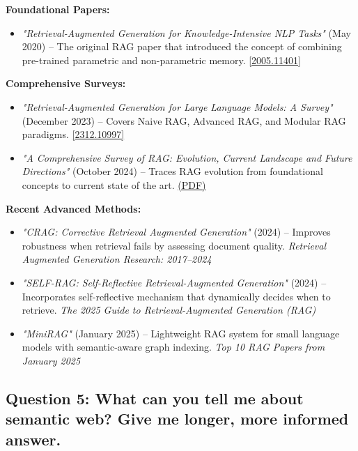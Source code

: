 \documentclass[fleqn,moreauthors,10pt]{ds_report}
\begin{document}
\begin{itemize}
\textbf{Foundational Papers:}
\begin{itemize}
    \item \textit{"Retrieval-Augmented Generation for Knowledge-Intensive NLP Tasks"} (May 2020) – The original RAG paper that introduced the concept of combining pre-trained parametric and non-parametric memory. \href{https://arxiv.org/abs/2005.11401}{[2005.11401]}
\end{itemize}

\textbf{Comprehensive Surveys:}
\begin{itemize}
    \item \textit{"Retrieval-Augmented Generation for Large Language Models: A Survey"} (December 2023) – Covers Naive RAG, Advanced RAG, and Modular RAG paradigms. \href{https://arxiv.org/abs/2312.10997}{[2312.10997]}
    \item \textit{"A Comprehensive Survey of RAG: Evolution, Current Landscape and Future Directions"} (October 2024) – Traces RAG evolution from foundational concepts to current state of the art. \href{https://www.researchgate.net/publication/375755035}{(PDF)}
\end{itemize}

\textbf{Recent Advanced Methods:}
\begin{itemize}
    \item \textit{"CRAG: Corrective Retrieval Augmented Generation"} (2024) – Improves robustness when retrieval fails by assessing document quality. \textit{Retrieval Augmented Generation Research: 2017–2024}
    \item \textit{"SELF-RAG: Self-Reflective Retrieval-Augmented Generation"} (2024) – Incorporates self-reflective mechanism that dynamically decides when to retrieve. \textit{The 2025 Guide to Retrieval-Augmented Generation (RAG)}
    \item \textit{"MiniRAG"} (January 2025) – Lightweight RAG system for small language models with semantic-aware graph indexing. \textit{Top 10 RAG Papers from January 2025}
\end{itemize}

\end{itemize}



\bigskip

\subsection*{Question 5: What can you tell me about semantic web? Give me longer, more informed answer.}
\end{document}
